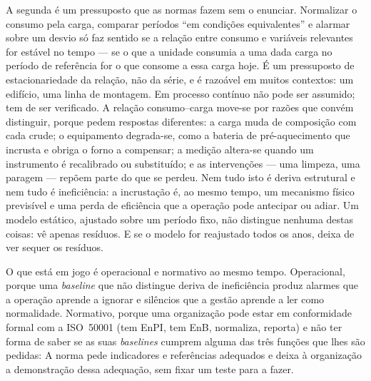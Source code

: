 A segunda é um pressuposto que as normas fazem sem o enunciar.
Normalizar o consumo pela carga, comparar períodos \enquote{em condições
equivalentes} e alarmar sobre um desvio só faz sentido se a relação
entre consumo e variáveis relevantes for estável no tempo --- se o que
a unidade consumia a uma dada carga no período de referência for o que
consome a essa carga hoje. É um pressuposto de estacionariedade da
relação, não da série, e é razoável em muitos contextos: um edifício,
uma linha de montagem. Em processo contínuo não pode ser assumido; tem
de ser verificado. A relação consumo--carga move-se por razões que
convém distinguir, porque pedem respostas diferentes: a carga muda de
composição com cada crude; o equipamento degrada-se, como a bateria de
pré-aquecimento que incrusta e obriga o forno a compensar; a medição
altera-se quando um instrumento é recalibrado ou substituído; e as
intervenções --- uma limpeza, uma paragem --- repõem parte do que se
perdeu. Nem tudo isto é deriva estrutural e nem tudo é ineficiência: a
incrustação é, ao mesmo tempo, um mecanismo físico previsível e uma
perda de eficiência que a operação pode antecipar ou adiar. Um modelo
estático, ajustado sobre um período fixo, não distingue nenhuma destas
coisas: vê apenas resíduos. E se o modelo for reajustado todos os anos,
deixa de ver sequer os resíduos.


O que está em jogo é operacional e normativo ao mesmo tempo.
Operacional, porque uma \emph{baseline} que não distingue deriva de
ineficiência produz alarmes que a operação aprende a ignorar e
silêncios que a gestão aprende a ler como normalidade. Normativo, porque
uma organização pode estar em conformidade formal com a ISO~50001 (tem
EnPI, tem EnB, normaliza, reporta) e não ter forma de saber se as
suas \emph{baselines} cumprem alguma das três funções que lhes são
pedidas:  A norma pede indicadores e referências
adequados e deixa à organização a demonstração dessa adequação, sem fixar
um teste para a fazer.


